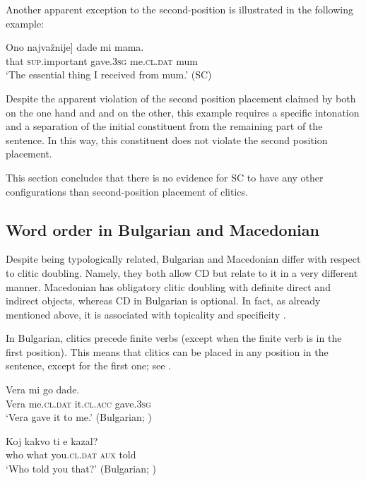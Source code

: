 \documentclass[output=paper,
colorlinks,
citecolor=brown,
newtxmath
]{langscibook}
\begin{document}
Another apparent exception to the second-position is illustrated in the following example:


\ea\label{ex:23}
\gll\minsp{[} Ono najvažnije]    dade     mi        mama.       \\
    {} that \textsc{sup}.important gave.\textsc{3sg} me.\textsc{cl.dat} mum \\
\glt `The essential thing I received from mum.'
\hfill (SC)
\z

\noindent Despite the apparent violation of the second position placement claimed by both \citet{Franks.King2000} on the one hand and \citet{Boskovic2001} and \citet{Radanovic-Kocic1988} on the other, this example requires a specific intonation and a separation of the initial constituent from the remaining part of the sentence. In this way, this constituent does not violate the second position placement.

This section concludes that there is no evidence for SC to have any other configurations than second-position placement of clitics.

\subsection{Word order in Bulgarian and Macedonian}
\label{subsec:orderBM}
Despite being typologically related, Bulgarian and Macedonian differ with respect to clitic doubling. Namely, they both allow CD but relate to it in a very different manner. Macedonian has obligatory clitic doubling with definite direct and indirect objects, whereas CD in Bulgarian is optional. In fact, as already mentioned above, it is associated with topicality and specificity \citep{Sportiche1996,Cinque.Krapova2008}.

In Bulgarian, clitics precede finite verbs (except when the finite verb is in the first position). This means that clitics can be placed in any position in the sentence, except for the first one; see .


\ea\label{ex:24}
\gll Vera mi        go         dade.           \\
     Vera me.\textsc{cl.dat} it.\textsc{cl.acc} gave.\textsc{3sg}\\
\glt `Vera gave it to me.'
\hfill (Bulgarian; \citealt[234]{Franks.King2000})
\z


\ea\label{ex:25}
\gll Koj kakvo ti          e    kazal?                                    \\
     who what  you.\textsc{cl.dat}  \textsc{aux}  told\\
\glt `Who told you that?'
\hfill (Bulgarian; \citealt[461]{rudin1988multiple})
\z
\end{document}
